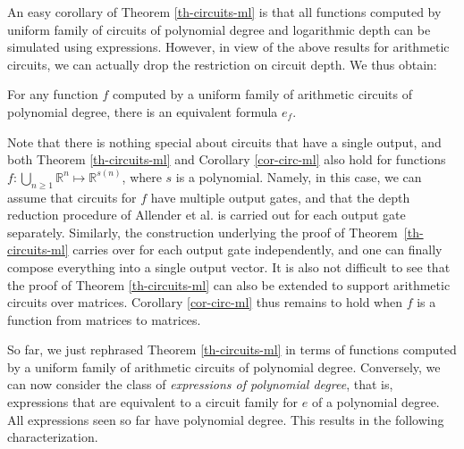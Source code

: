 
An easy corollary of Theorem \ref{th-circuits-ml} is that all functions computed by uniform family of circuits of polynomial degree and logarithmic depth can be simulated using \langfor expressions. However, in view of the above results for arithmetic circuits, we can actually drop the restriction on circuit depth.
We thus obtain:


\begin{corollary}
\label{cor-circ-ml}
For any function $f$ computed by a uniform family of arithmetic circuits of polynomial degree, there is an equivalent \langfor formula $e_f$.
\end{corollary}

Note that there is nothing special about circuits that have a single output, and both Theorem \ref{th-circuits-ml} and Corollary \ref{cor-circ-ml} also hold for functions  $f:\bigcup_{n\geq 1} \mathbb{R}^n\mapsto\mathbb{R}^{s(n)}$, where $s$ is a polynomial. Namely, in this case, we can assume that circuits for $f$ have multiple output gates, and that the depth reduction procedure of Allender et al. \cite{AllenderJMV98} is carried out for each output gate separately. Similarly, the construction underlying the proof of Theorem~\ref{th-circuits-ml} carries over for each output gate independently, and one can finally compose everything into a single output vector.
It is also  not difficult to see that the proof of Theorem \ref{th-circuits-ml} can also be extended to support arithmetic circuits over matrices. Corollary \ref{cor-circ-ml} thus remains to hold when $f$ is a function from matrices to matrices.


So far, we just rephrased  Theorem \ref{th-circuits-ml} in terms of functions computed by a uniform family of arithmetic circuits of polynomial degree.
Conversely, we can now consider the class of \textit{\langfor expressions of polynomial degree}, that is,  \langfor expressions that are equivalent to a circuit family for $e$ of a polynomial degree.  All \langfor expressions seen so far have polynomial degree. This results in the following characterization.
%


